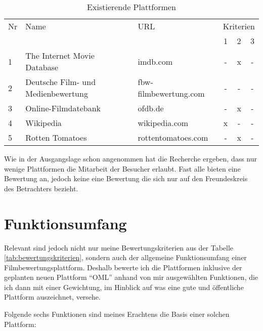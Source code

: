 \begin{table}[h]
\begin{center}
    \begin{tabular}{lllccc}
        \toprule Nr & Name & URL & \multicolumn{3}{c}{Kriterien} \\ & & & 1 & 2 & 3 \\
        \midrule 1 & The Internet Movie Database & imdb.com & - & x & - \\
        \midrule 2 & Deutsche Film- und Medienbewertung & fbw-filmbewertung.com & - & - & - \\
        \midrule 3 & Online-Filmdatebank & ofdb.de & - & x & - \\
        \midrule 4 & Wikipedia & wikipedia.com & x & - & - \\
        \midrule 5 & Rotten Tomatoes & rottentomatoes.com & - & x & - \\
        \bottomrule
    \end{tabular}
    \caption{Existierende Plattformen}
    \label{tab:plattformen}
\end{center}
\end{table}

Wie in der Ausgangslage schon angenommen hat die Recherche ergeben, dass nur
wenige Plattformen die Mitarbeit der Besucher erlaubt. Fast alle bieten
eine Bewertung an, jedoch keine eine Bewertung die sich nur auf den
Freundeskreis des Betrachters bezieht.

\section{Funktionsumfang}
Relevant sind jedoch nicht nur meine Bewertungskriterien aus der Tabelle \ref{tab:bewertungskriterien},
sondern auch der allgemeine Funktionsumfang einer Filmbewertungsplattform.
Deshalb bewerte ich die Plattformen inklusive der geplanten neuen Plattform ``OML'' 
anhand von mir ausgewählten Funktionen, die ich dann mit einer Gewichtung,
im Hinblick auf was eine gute und öffentliche Plattform auszeichnet, versehe.

Folgende sechs Funktionen sind meines Erachtens die Basis einer solchen Plattform: 

